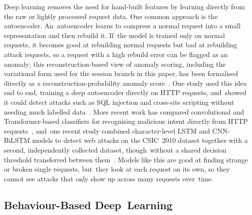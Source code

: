 \documentclass[futureinternet,article,accept,moreauthors]{Definitions/mdpi}
\begin{document}
Deep learning removes the need for hand-built features by learning directly from the raw or lightly processed request data. One common approach is the autoencoder. An~autoencoder learns to compress a normal request into a small representation and then rebuild it. If~the model is trained only on normal requests, it becomes good at rebuilding normal requests but bad at rebuilding attack requests, so a request with a high rebuild error can be flagged as an anomaly; this reconstruction-based view of anomaly scoring, including the variational form used for the session branch in this paper, has been formalised directly as a reconstruction-probability anomaly score~\cite{ancho2015}. One study used this idea end to end, training a deep autoencoder directly on HTTP requests, and~showed it could detect attacks such as SQL injection and cross-site scripting without needing much labelled data~\cite{pan2019}. More recent work has compared convolutional and Transformer-based classifiers for recognising malicious intent directly from HTTP requests~\cite{tiwari2024}, and~one recent study combined character-level LSTM and CNN-BiLSTM models to detect web attacks on the CSIC~2010 dataset together with a second, independently collected dataset, though~without a shared decision threshold transferred between them~\cite{zhou2025}. Models like this are good at finding strange or broken single requests, but~they look at each request on its own, so they cannot see attacks that only show up across many requests over~time.

\subsection{Behaviour-Based Deep~Learning}

\end{document}
